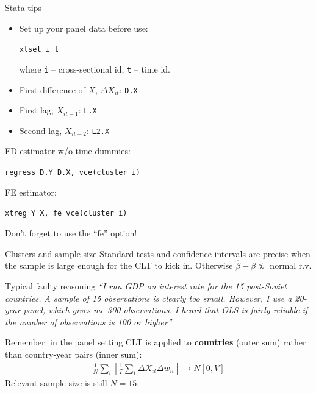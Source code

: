 \documentclass[notes=show,beamer,compress]{beamer}
\begin{document}
\begin{frame}{Stata tips}
\begin{itemize}
	\item{
	Set up your panel data before use:
\begin{center}
	\texttt{xtset i t}
\end{center}
where \texttt{i} -- cross-sectional id, \texttt{t} -- time id.}
	\item{First difference of $X$, $\Delta{}X_{it}$: \texttt{D.X}}
	\item{First lag, $X_{it-1}$: \texttt{L.X}}
	\item{Second lag, $X_{it-2}$: \texttt{L2.X}}
\end{itemize}
FD estimator w/o time dummies:
\begin{center}
\texttt{regress D.Y D.X, vce(cluster i)}\\\smallskip
\end{center}
FE estimator:
\begin{center}
\texttt{xtreg Y X, fe vce(cluster i)}
\end{center}
Don't forget to use the ``fe'' option!
\end{frame}

\begin{frame}{Clusters and sample size}
	Standard tests and confidence intervals are precise when the sample is large enough for the CLT to kick in. Otherwise $\widehat\beta - \beta \not\approx$ normal r.v.\\\medskip
	
	\begin{block}{Typical faulty reasoning}
		\itshape
		``I run GDP on interest rate for the 15 post-Soviet countries. A sample of 15 observations is clearly too small. However, I use a 20-year panel, which gives me 300 observations. I heard that OLS is fairly reliable if the number of observations is 100 or higher''
	\end{block}
	Remember: in the panel setting CLT is applied to \textbf{countries} (outer sum) rather than country-year pairs (inner sum):
	\begin{align*}
	\frac{1}{N}\sum_i\left[\frac{1}{T}\sum_t\Delta{}X_{it}\Delta w_{it}\right]\to{}N[0, V]
	\end{align*}
	Relevant sample size is still $N=15$.
\end{frame}


\end{document}
